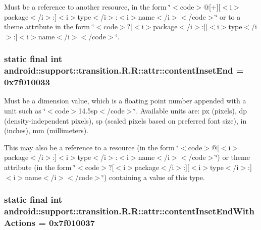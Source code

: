 Must be a reference to another resource, in the form \char`\"{}$<$code$>$@\mbox{[}+\mbox{]}\mbox{[}$<$i$>$package$<$/i$>$:\mbox{]}$<$i$>$type$<$/i$>$:$<$i$>$name$<$/i$>$$<$/code$>$\char`\"{} or to a theme attribute in the form \char`\"{}$<$code$>$?\mbox{[}$<$i$>$package$<$/i$>$:\mbox{]}\mbox{[}$<$i$>$type$<$/i$>$:\mbox{]}$<$i$>$name$<$/i$>$$<$/code$>$\char`\"{}. \hypertarget{classandroid_1_1support_1_1transition_1_1_r_1_1attr_2ade831c6d8096fa1b5989ad5b467ce0}{
\subsubsection[{contentInsetEnd}]{\setlength{\rightskip}{0pt plus 5cm}static final int android::support::transition.R.R::attr::contentInsetEnd = 0x7f010033}}
\label{classandroid_1_1support_1_1transition_1_1_r_1_1attr_2ade831c6d8096fa1b5989ad5b467ce0}


Must be a dimension value, which is a floating point number appended with a unit such as \char`\"{}$<$code$>$14.5sp$<$/code$>$\char`\"{}. Available units are: px (pixels), dp (density-independent pixels), sp (scaled pixels based on preferred font size), in (inches), mm (millimeters). 

This may also be a reference to a resource (in the form \char`\"{}$<$code$>$@\mbox{[}$<$i$>$package$<$/i$>$:\mbox{]}$<$i$>$type$<$/i$>$:$<$i$>$name$<$/i$>$$<$/code$>$\char`\"{}) or theme attribute (in the form \char`\"{}$<$code$>$?\mbox{[}$<$i$>$package$<$/i$>$:\mbox{]}\mbox{[}$<$i$>$type$<$/i$>$:\mbox{]}$<$i$>$name$<$/i$>$$<$/code$>$\char`\"{}) containing a value of this type. \hypertarget{classandroid_1_1support_1_1transition_1_1_r_1_1attr_d4c882c33f445ea4d084c7010a03e604}{
\subsubsection[{contentInsetEndWithActions}]{\setlength{\rightskip}{0pt plus 5cm}static final int android::support::transition.R.R::attr::contentInsetEndWithActions = 0x7f010037}}
\label{classandroid_1_1support_1_1transition_1_1_r_1_1attr_d4c882c33f445ea4d084c7010a03e604}



